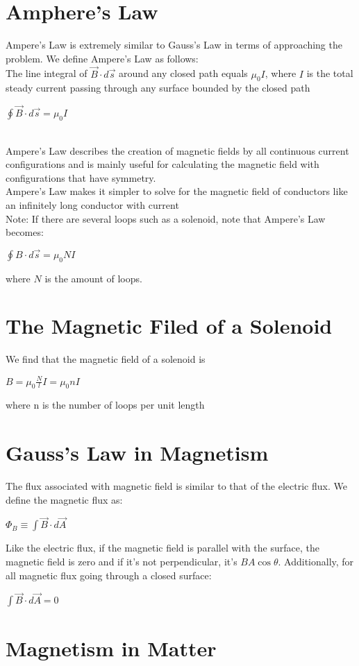 \documentclass[12pt]{report}
\begin{document}
	\section{Amphere's Law}
		Ampere's Law is extremely similar to Gauss's Law in terms of approaching the problem. We define Ampere's Law as follows:\\
		The line integral of $\vec{B} \cdot d\vec{s}$ around any closed path equals $\mu_0I$, where $I$ is the total steady current passing through any surface bounded by the closed path\\
		\centerline{$\oint \vec{B} \cdot d\vec{s} = \mu_0 I$}
		\\
		Ampere's Law describes the creation of magnetic fields by all continuous current configurations and is mainly useful for calculating the magnetic field with configurations that have symmetry.\\
		Ampere's Law makes it simpler to solve for the magnetic field of conductors like an infinitely long conductor with current\\
		Note: If there are several loops such as a solenoid, note that Ampere's Law becomes:\\
		\centerline{$\oint B \cdot d\vec{s} = \mu_0NI$}
		where $N$ is the amount of loops.
	\section{The Magnetic Filed of a Solenoid}
		We find that the magnetic field of a solenoid is \\
		\centerline{$B = \mu_0 \frac{N}{l}I = \mu_0 nI$}
		where n is the number of loops per unit length
	\section{Gauss's Law in Magnetism}
		The flux associated with magnetic field is similar to that of the electric flux. We define the magnetic flux as:\\
		\centerline{$\Phi_B \equiv \int \vec{B} \cdot d\vec{A}$}
		Like the electric flux, if the magnetic field is parallel with the surface, the magnetic field is zero and if it's not perpendicular, it's $BA\cos \theta$. Additionally, for all magnetic flux going through a closed surface:\\
		\centerline{$\int \vec{B} \cdot d\vec{A} = 0$}
	\section{Magnetism in Matter}
\end{document}

